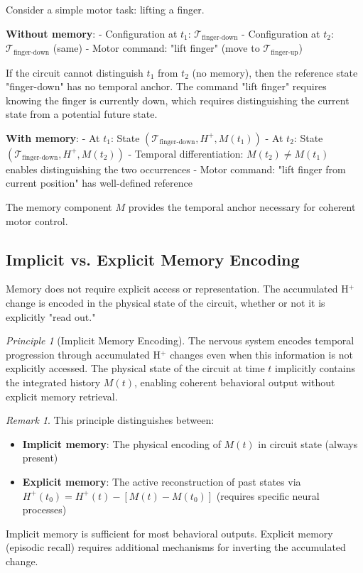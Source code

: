 \documentclass[aps,prd,twocolumn,superscriptaddress,floatfix,nofootinbib]{revtex4-2}
\theoremstyle{remark}
\newtheorem{remark}[theorem]{Remark}
\newtheorem{principle}[theorem]{Principle}
\begin{document}
\begin{example}
\label{ex:motor_memory}
Consider a simple motor task: lifting a finger.

\textbf{Without memory}:
- Configuration at $t_1$: $\mathcal{T}_{\text{finger-down}}$
- Configuration at $t_2$: $\mathcal{T}_{\text{finger-down}}$ (same)
- Motor command: "lift finger" (move to $\mathcal{T}_{\text{finger-up}}$)

If the circuit cannot distinguish $t_1$ from $t_2$ (no memory), then the reference state "finger-down" has no temporal anchor. The command "lift finger" requires knowing the finger is currently down, which requires distinguishing the current state from a potential future state.

\textbf{With memory}:
- At $t_1$: State $(\mathcal{T}_{\text{finger-down}}, H^+, M(t_1))$
- At $t_2$: State $(\mathcal{T}_{\text{finger-down}}, H^+, M(t_2))$
- Temporal differentiation: $M(t_2) \neq M(t_1)$ enables distinguishing the two occurrences
- Motor command: "lift finger from current position" has well-defined reference

The memory component $M$ provides the temporal anchor necessary for coherent motor control.
\end{example}

\subsection{Implicit vs. Explicit Memory Encoding}

Memory does not require explicit access or representation. The accumulated H$^+$ change is encoded in the physical state of the circuit, whether or not it is explicitly "read out."

\begin{principle}[Implicit Memory Encoding]
\label{princ:implicit_memory}
The nervous system encodes temporal progression through accumulated H$^+$ changes even when this information is not explicitly accessed. The physical state of the circuit at time $t$ implicitly contains the integrated history $M(t)$, enabling coherent behavioral output without explicit memory retrieval.
\end{principle}

\begin{remark}
This principle distinguishes between:
\begin{itemize}
\item \textbf{Implicit memory}: The physical encoding of $M(t)$ in circuit state (always present)
\item \textbf{Explicit memory}: The active reconstruction of past states via $H^+(t_0) = H^+(t) - [M(t) - M(t_0)]$ (requires specific neural processes)
\end{itemize}

Implicit memory is sufficient for most behavioral outputs. Explicit memory (episodic recall) requires additional mechanisms for inverting the accumulated change.
\end{remark}
\end{document}
